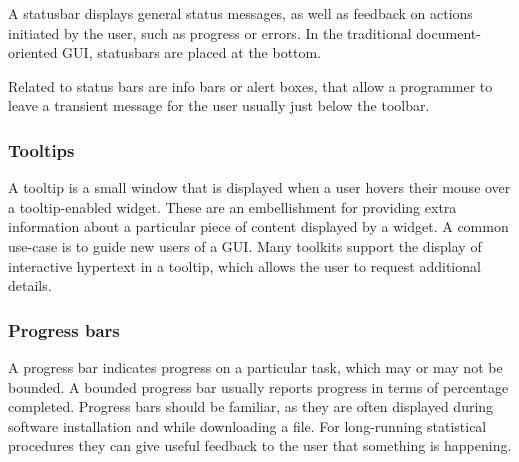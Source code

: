 A statusbar displays general status messages, as well as feedback on
actions initiated by the user, such as progress or errors. In the
traditional document-oriented GUI, statusbars are placed at the bottom.

Related to status bars are info bars or alert boxes, that allow a
programmer to leave a transient message for the user usually just
below the toolbar.

\subsubsection{Tooltips}
\label{sec:GUI:basic-tooltips}

A tooltip is a small window that is displayed when a user hovers their
mouse over a tooltip-enabled widget. These are an embellishment for
providing extra information about a particular piece of content
displayed by a widget. A common use-case is to guide new users of a
GUI. Many toolkits support the display of interactive hypertext in a
tooltip, which allows the user to request additional details.

\subsubsection{Progress bars}

A progress bar indicates progress on a particular task, which may or
may not be bounded. A bounded progress bar usually reports progress in
terms of percentage completed. Progress bars should be familiar, as
they are often displayed during software installation and while
downloading a file. For long-running statistical procedures they can
give useful feedback to the user that something is happening.






